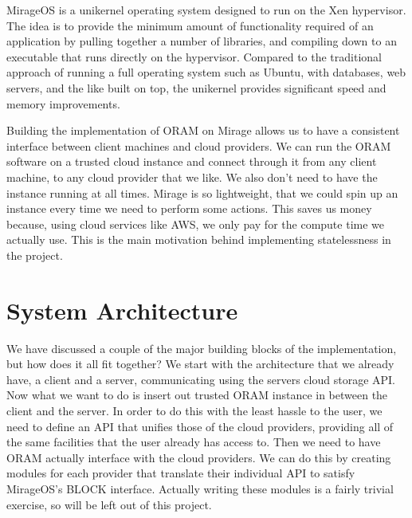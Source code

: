 \documentclass[12pt,a4paper,twoside,openright]{report}
\begin{document}
MirageOS is a unikernel operating system designed to run on the Xen hypervisor. The idea is to provide the minimum amount of functionality required of an application by pulling together a number of libraries, and compiling down to an executable that runs directly on the hypervisor. Compared to the traditional approach of running a full operating system such as Ubuntu, with databases, web servers, and the like built on top, the unikernel provides significant speed and memory improvements.

Building the implementation of ORAM on Mirage allows us to have a consistent interface between client machines and cloud providers. We can run the ORAM software on a trusted cloud instance and connect through it from any client machine, to any cloud provider that we like. We also don't need to have the instance running at all times. Mirage is so lightweight, that we could spin up an instance every time we need to perform some actions. This saves us money because, using cloud services like AWS, we only pay for the compute time we actually use. This is the main motivation behind implementing statelessness in the project.

\section{System Architecture}

\setlength{\unitlength}{0.75mm}

\setlength{\unitlength}{0.5mm}

We have discussed a couple of the major building blocks of the implementation, but how does it all fit together? We start with the architecture that we already have, a client and a server, communicating using the servers cloud storage API. Now what we want to do is insert out trusted ORAM instance in between the client and the server. In order to do this with the least hassle to the user, we need to define an API that unifies those of the cloud providers, providing all of the same facilities that the user already has access to. Then we need to have ORAM actually interface with the cloud providers. We can do this by creating modules for each provider that translate their individual API to satisfy MirageOS's BLOCK interface. Actually writing these modules is a fairly trivial exercise, so will be left out of this project.
\end{document}
